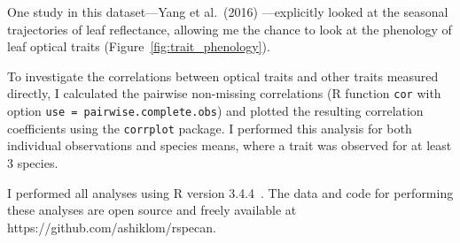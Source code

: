 One study in this dataset---Yang et al.~(2016) \nocite{yang_2016_seasonal}---explicitly looked at the seasonal trajectories of leaf reflectance, allowing me the chance to look at the phenology of leaf optical traits (Figure~\ref{fig:trait_phenology}).

To investigate the correlations between optical traits and other traits measured directly, I calculated the pairwise non-missing correlations (R function \texttt{cor} with option \texttt{use = pairwise.complete.obs}) and plotted the resulting correlation coefficients using the \texttt{corrplot} package.
I performed this analysis for both individual observations and species means, where a trait was observed for at least 3 species.

I performed all analyses using R version 3.4.4~\cite{rstats}.
The data and code for performing these analyses are open source and freely available at https://github.com/ashiklom/rspecan.

